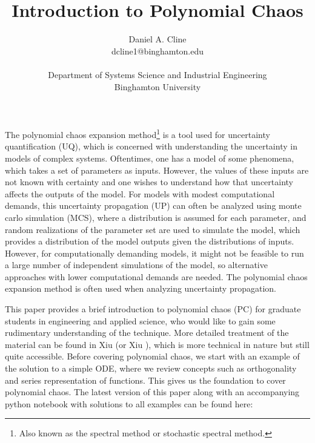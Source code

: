\documentclass[11pt]{article}
\numberwithin{equation}{section}
\newcommand{\titlebox}[6]{
   \vspace*{-2cm}
   \noindent
   \begin{center}
   \framebox{
      \vbox{\vspace{1mm}
       \hbox to 5.83in { {\em #2 \hfill #3 } }
       \vspace{4mm}
       \hbox to 5.83in { \hfill {\bf \Large  #1 }\hfill }
       \vspace{4mm}
       \hbox to 5.83in { {\em #4 \hfill #5 } }
      \vspace{1mm}}
   }
   \end{center}
   \vspace*{2mm}
}
\begin{document}

\title{\vspace*{-1cm}Introduction to Polynomial Chaos}
\author{Daniel A. Cline\\ dcline1@binghamton.edu\\ \\ Department of Systems Science and Industrial Engineering\\ Binghamton University}
\maketitle

The polynomial chaos expansion method\footnote{Also known as the spectral method or stochastic spectral method.} is a tool used for uncertainty quantification (UQ), which is concerned with understanding the uncertainty in models of complex systems. Oftentimes, one has a model of some phenomena, which takes a set of parameters as inputs. However, the values of these inputs are not known with certainty and one wishes to understand how that uncertainty affects the outputs of the model. For models with modest computational demands, this uncertainty propagation (UP) can often be analyzed using monte carlo simulation (MCS), where a distribution is assumed for each parameter, and random realizations of the parameter set are used to simulate the model, which provides a distribution of the model outputs given the distributions of inputs. However, for computationally demanding models, it might not be feasible to run a large number of independent simulations of the model, so alternative approaches with lower computational demands are needed. The polynomial chaos expansion method is often used when analyzing uncertainty propagation.

\qquad This paper provides a brief introduction to polynomial chaos (PC) for graduate students in engineering and applied science, who would like to gain some rudimentary understanding of the technique. More detailed treatment of the material can be found in Xiu \cite{X10} (or Xiu \cite{X04}), which is more technical in nature but still quite accessible. Before covering polynomial chaos, we start with an example of the solution to a simple ODE, where we review concepts such as orthogonality and series representation of functions. This gives us the foundation to cover polynomial chaos. The latest version of this paper along with an accompanying python notebook with solutions to all examples can be found here:
\end{document}
